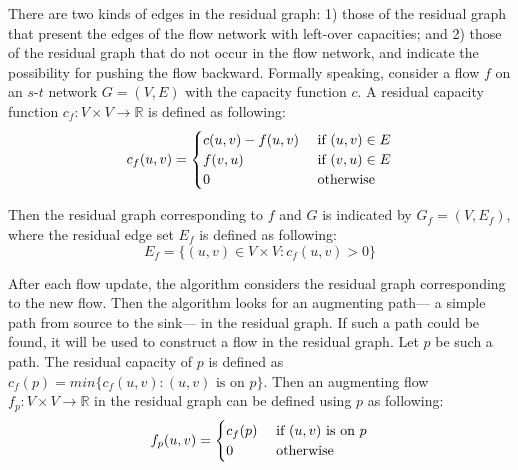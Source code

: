 \documentclass{llncs}
\begin{document}

There are two kinds of edges in the residual graph: 1) those of the residual graph that present the edges of the flow network with left-over capacities; and 2) those of the residual graph that do not occur in the flow network, and indicate the possibility for pushing the flow backward. Formally speaking, consider a flow $f$ on an $s$-$t$ network $G = (V, E)$ with the capacity function $c$. A residual capacity function $c_f \colon V \times V \rightarrow \mathbb{R}$ is defined as following:
\[ c_f (u, v) = 
	\begin{cases}
	c (u, v) - f(u, v) \hfill & \text{ if $(u, v) \in E$} \\
	f (v, u) \hfill & \text{ if $(v, u) \in E$} \\	
	0 \hfill & \text{ otherwise} \\
	\end{cases} 
\]

Then the residual graph corresponding to $f$ and $G$ is indicated by $G_f = (V, E_f)$, where the residual edge set $E_f$ is defined as following:
\[ E_f = \{(u,v) \in V \times V \colon c_f (u, v) > 0\}\]

After each flow update, the algorithm considers the residual graph corresponding to the new flow. Then the algorithm looks for an augmenting path--- a simple path from source to the sink--- in the residual graph. If such a path could be found, it will be used to construct a flow in the residual graph. Let $p$ be such a path. The residual capacity of $p$ is defined as $c_f(p) = min \{c_f(u, v): \text{$(u, v)$ is on  $p$}\}$. Then an augmenting flow $f_p \colon V \times V \rightarrow \mathbb{R}$  in the residual graph can be defined using $p$ as following:
\[ f_p (u, v) = 
	\begin{cases}
	c_f(p) \hfill & \text{ if $(u, v)$ is on $p$} \\	
	0 \hfill & \text{ otherwise} \\
	\end{cases} 
\]
\end{document}
